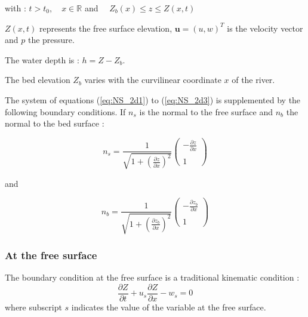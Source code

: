with : $t> t_0, \quad x \in \mathbb{R}$  and $\quad Z_b(x) \leq z \leq Z(x,t)$

$Z(x,t)$ represents the free surface elevation, $\mathbf{u}=(u,w)^T$ is the velocity vector and $p$ the pressure.

The water depth is : $h = Z - Z_b$.

The bed elevation $Z_b$ varies with the curvilinear coordinate $x$ of the river.


The system of equations (\ref{eq:NS_2d1}) to (\ref{eq:NS_2d3}) is supplemented by the following boundary conditions. If $n_s$ is the normal to the free surface and $n_b$ the normal to the bed surface :

\begin{equation}
 n_s = \frac{1}{\displaystyle  \sqrt{1 + \left( \frac{\partial z}{\partial x}\right)^2} }  \left( \begin{array}{c} -\frac{\partial z}{\partial x}\\ \\ 1 \end{array} \right)
\end{equation}

and

\begin{equation}
 n_b = \frac{1}{\displaystyle \sqrt{1 + \left( \frac{\partial z_b}{\partial x}\right)^2}}  \left(\begin{array}{c} -\frac{\partial z_b}{\partial x}\\ \\ 1 \end{array} \right)
\end{equation}

\subsubsection{At the free surface}

The boundary condition at the free surface is a traditional kinematic condition :
\begin{equation}
\frac{\partial Z}{\partial t} + u_s \frac{\partial Z}{\partial x}
-w_s = 0
\label{eq:free_surf}
\end{equation}
where subscript $s$ indicates the value of the variable at the free surface.

